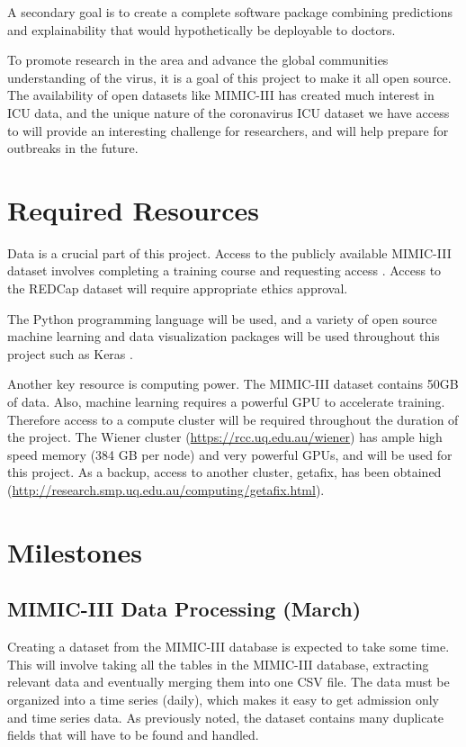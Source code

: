 \documentclass[12pt]{article}
\begin{document}
A secondary goal is to create a complete software package combining predictions and explainability that would hypothetically be deployable to doctors.

To promote research in the area and advance the global communities understanding of the virus, it is a goal of this project to make it all open source. The availability of open datasets like MIMIC-III has created much interest in ICU data, and the unique nature of the coronavirus ICU dataset we have access to will provide an interesting challenge for researchers, and will help prepare for outbreaks in the future.  

\section{Required Resources }

Data is a crucial part of this project. Access to the publicly available MIMIC-III dataset involves completing a training course and requesting access \cite{MIMICIIIdatabase}. Access to the REDCap dataset will require appropriate ethics approval. 

The Python programming language will be used, and a variety of open source machine learning and data visualization packages will be used throughout this project such as Keras \cite{keras}.

Another key resource is computing power. The MIMIC-III dataset contains 50GB of data. Also, machine learning requires a powerful GPU to accelerate training. Therefore access to a compute cluster will be required throughout the duration of the project. The Wiener cluster (\url{https://rcc.uq.edu.au/wiener}) has ample high speed memory (384 GB per node) and very powerful GPUs, and will be used for this project. As a backup, access to another cluster, getafix, has been obtained (\url{http://research.smp.uq.edu.au/computing/getafix.html}). 

\section{Milestones}

\subsection{MIMIC-III Data Processing (March)}

Creating a dataset from the MIMIC-III database is expected to take some time. This will involve taking all the tables in the MIMIC-III database, extracting relevant data and eventually merging them into one CSV file. The data must be organized into a time series (daily), which makes it easy to get admission only and time series data. As previously noted, the dataset contains many duplicate fields that will have to be found and handled.
\end{document}
